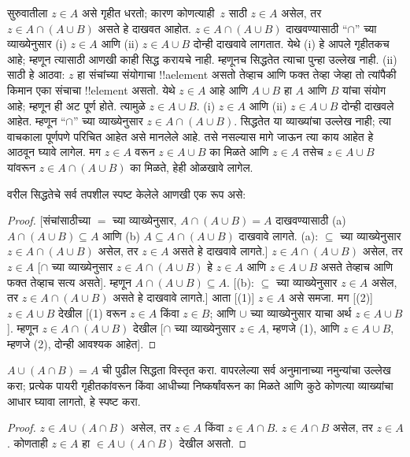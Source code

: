\documentclass[../../../include/open-logic-section]{subfiles}
\begin{document}
सुरुवातीला $z \in A$ असे गृहीत धरतो; कारण कोणत्याही~$z$ साठी $z \in A$ असेल, तर $z \in A \cap (A \cup B)$ असते हे दाखवत आहोत. $z \in A \cap (A \cup B)$ दाखवण्यासाठी “$\cap$” च्या व्याख्येनुसार (i) $z \in A$ आणि (ii) $z \in A \cup B$ दोन्ही दाखवावे लागतात. येथे (i) हे आपले गृहीतकच आहे; म्हणून त्यासाठी आणखी काही सिद्ध करायचे नाही. म्हणूनच सिद्धतेत त्याचा पुन्हा उल्लेख नाही. (ii) साठी हे आठवा: $z$ हा संचांच्या संयोगाचा !!a{element} असतो तेव्हाच आणि फक्त तेव्हा जेव्हा तो त्यांपैकी किमान एका संचाचा !!{element} असतो. येथे $z \in A$ आहे आणि $A \cup B$ हा $A$ आणि $B$ यांचा संयोग आहे; म्हणून ही अट पूर्ण होते. त्यामुळे $z \in A \cup B$. (i) $z \in A$ आणि (ii) $z \in A \cup B$ दोन्ही दाखवले आहेत. म्हणून “$\cap$” च्या व्याख्येनुसार $z \in A \cap (A \cup B)$. सिद्धतेत या व्याख्यांचा उल्लेख नाही; त्या वाचकाला पूर्णपणे परिचित आहेत असे मानलेले आहे. तसे नसल्यास मागे जाऊन त्या काय आहेत हे आठवून घ्यावे लागेल. मग $z \in A$ वरून $z \in A \cup B$ का मिळते आणि $z \in A$ तसेच $z \in A \cup B$ यांवरून $z \in A \cap (A \cup B)$ का मिळते, हेही ओळखावे लागेल.

वरील सिद्धतेचे सर्व तपशील स्पष्ट केलेले आणखी एक रूप असे:
\begin{proof}{}
[संचांसाठीच्या $=$ च्या व्याख्येनुसार, $A \cap (A \cup B) = A$ दाखवण्यासाठी (a) $A \cap (A \cup B) \subseteq A$ आणि (b) $A \subseteq A \cap (A \cup B)$ दाखवावे लागते. (a): $\subseteq$ च्या व्याख्येनुसार $z \in A \cap (A \cup B)$ असेल, तर $z \in A$ असते हे दाखवावे लागते.] $z \in A \cap (A \cup B)$ असेल, तर $z \in A$ [$\cap$ च्या व्याख्येनुसार $z \in A \cap (A \cup B)$ हे $z \in A$ आणि $z \in A \cup B$ असते तेव्हाच आणि फक्त तेव्हाच सत्य असते]. म्हणून $A \cap (A \cup B) \subseteq A$. [(b): $\subseteq$ च्या व्याख्येनुसार $z \in A$ असेल, तर $z \in A \cap (A \cup B)$ असते हे दाखवावे लागते.] आता [(1)] $z \in A$ असे समजा. मग [(2)] $z \in A \cup B$ देखील [(1) वरून $z \in A$ किंवा $z \in B$; आणि $\cup$ च्या व्याख्येनुसार याचा अर्थ $z \in A \cup B$]. म्हणून $z \in A \cap (A \cup B)$ देखील [$\cap$ च्या व्याख्येनुसार $z \in A$, म्हणजे (1), आणि $z \in A \cup B$, म्हणजे (2), दोन्ही आवश्यक आहेत].
\end{proof}

\begin{prob}
$A \cup (A \cap B) = A$ ची पुढील सिद्धता विस्तृत करा. वापरलेल्या सर्व अनुमानाच्या नमुन्यांचा उल्लेख करा; प्रत्येक पायरी गृहीतकांवरून किंवा आधीच्या निष्कर्षांवरून का मिळते आणि कुठे कोणत्या व्याख्यांचा आधार घ्यावा लागतो, हे स्पष्ट करा.
\begin{proof}
$z \in A \cup (A \cap B)$ असेल, तर $z \in A$ किंवा $z \in A \cap B$. $z \in A \cap B$ असेल, तर $z \in A$. कोणताही $z \in A$ हा $\in A \cup (A \cap B)$ देखील असतो.
\end{proof}
\end{prob}
\end{document}
